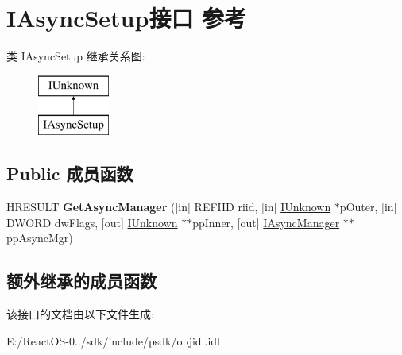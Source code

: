 \hypertarget{interface_i_async_setup}{}\section{I\+Async\+Setup接口 参考}
\label{interface_i_async_setup}
类 I\+Async\+Setup 继承关系图\+:\begin{figure}[H]
\begin{center}
\leavevmode
\includegraphics[height=2.000000cm]{interface_i_async_setup}
\end{center}
\end{figure}
\subsection*{Public 成员函数}
\begin{DoxyCompactItemize}
\item 
\mbox{\label{interface_i_async_setup_a97bd3a6fee9eb8ea3974f56020a54828}} 
H\+R\+E\+S\+U\+LT {\bfseries Get\+Async\+Manager} (\mbox{[}in\mbox{]} R\+E\+F\+I\+ID riid, \mbox{[}in\mbox{]} \hyperlink{interface_i_unknown}{I\+Unknown} $\ast$p\+Outer, \mbox{[}in\mbox{]} D\+W\+O\+RD dw\+Flags, \mbox{[}out\mbox{]} \hyperlink{interface_i_unknown}{I\+Unknown} $\ast$$\ast$pp\+Inner, \mbox{[}out\mbox{]} \hyperlink{interface_i_async_manager}{I\+Async\+Manager} $\ast$$\ast$pp\+Async\+Mgr)
\end{DoxyCompactItemize}
\subsection*{额外继承的成员函数}


该接口的文档由以下文件生成\+:\begin{DoxyCompactItemize}
\item 
E\+:/\+React\+O\+S-\/0../sdk/include/psdk/objidl.\+idl\end{DoxyCompactItemize}
